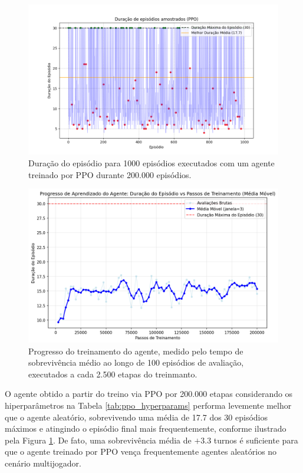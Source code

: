 \documentclass[conference]{IEEEtran}
\begin{document}
\begin{figure}[htpb]
    \centering
    \includegraphics[width=1\linewidth]{figures/episode_lengths_ppo.png}
    \caption{Duração do episódio para 1000 episódios executados com um agente treinado por PPO durante 200.000 episódios.}
    \label{fig:ep_lens_ppo}
\end{figure}

\begin{figure}[htpb]
    \centering
    \includegraphics[width=1\linewidth]{figures/eval_progress.png}
    \caption{Progresso do treinamento do agente, medido pelo tempo de sobrevivência médio ao longo de 100 episódios de avaliação, executados a cada 2.500 etapas do treinmanto.}
    \label{fig:eval_progress}
\end{figure}

O agente obtido a partir do treino via PPO por 200.000 etapas considerando os hiperparâmetros na Tabela \ref{tab:ppo_hyperparams} performa levemente melhor que o agente aleatório, sobrevivendo uma média de 17.7 dos 30 episódios máximos e atingindo o episódio final mais frequentemente, conforme ilustrado pela Figura \ref{fig:ep_lens_ppo}. De fato, uma sobrevivência média de $+3.3$ turnos é suficiente para que o agente treinado por PPO vença frequentemente agentes aleatórios no cenário multijogador.
\end{document}
